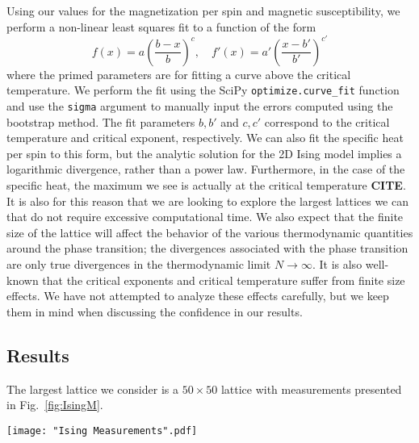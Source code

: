 \documentclass[twocolumn,aps,prl]{revtex4-1} %
\begin{document}
Using our values for the magnetization per spin and magnetic susceptibility, we perform a non-linear least squares fit to a function of the form
\begin{equation}
	f(x) = a\left(\frac{b-x}{b}\right)^c, \quad f'(x) = a'\left(\frac{x-b'}{b'}\right)^{c'}
\end{equation}
where the primed parameters are for fitting a curve above the critical temperature. We perform the fit using the SciPy \texttt{optimize.curve\_fit} function and use the \texttt{sigma} argument to manually input the errors computed using the bootstrap method. The fit parameters $b,b'$ and $c,c'$ correspond to the critical temperature and critical exponent, respectively. We can also fit the specific heat per spin to this form, but the analytic solution for the 2D Ising model implies a logarithmic divergence, rather than a power law. Furthermore, in the case of the specific heat, the maximum we see is actually at the critical temperature \textbf{CITE}. It is also for this reason that we are looking to explore the largest lattices we can that do not require excessive computational time. We also expect that the finite size of the lattice will affect the behavior of the various thermodynamic quantities around the phase transition; the divergences associated with the phase transition are only true divergences in the thermodynamic limit $N \to \infty$. It is also well-known that the critical exponents and critical temperature suffer from finite size effects. We have not attempted to analyze these effects carefully, but we keep them in mind when discussing the confidence in our results.


\subsection{Results}
The largest lattice we consider is a $50 \times 50$ lattice with measurements presented in Fig.~\ref{fig:IsingM}.
\begin{figure*}
	\texttt{[image: "Ising Measurements".pdf]}
	\caption{\label{fig:IsingM}Plots showing the mean energy per spin, specific heat per spin, mean (absolute) magnetization per spin, magnetic susceptibility on a 50 $\times$ 50 lattice from $T = 1.6$ to $T = 2.9$ in increments of $\Delta T = .01$. The lines overlaid on the data are lines of best-of-fit determined using \texttt{optimize.curve\_fit}. The equilibration time at each temperature is 5000 sweeps and each data point is obtained from 5000 measurements. The error bars computed using the bootstrap method are too small to see.}
\end{figure*}
\end{document}
